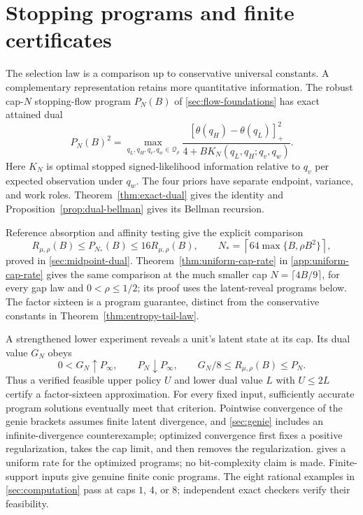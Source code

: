 \section{Stopping programs and finite certificates}\label{sec:certificates}
The selection law is a comparison up to conservative universal constants.
A complementary representation retains more quantitative information.
The robust cap-$N$ stopping-flow program $P_N(B)$ of
\cref{sec:flow-foundations} has exact attained dual
\[
 P_N(B)^2=
 \max_{q_L,q_H,q_v,q_w\in\mathcal Q_\rho}
 \frac{[\theta(q_H)-\theta(q_L)]_+^2}
 {4+B K_N(q_L,q_H;q_v,q_w)}.
\]
Here $K_N$ is optimal stopped signed-likelihood information relative to
$q_v$ per expected observation under $q_w$.
The four priors have separate endpoint, variance, and work roles.
Theorem~\ref{thm:exact-dual} gives the identity and
Proposition~\ref{prop:dual-bellman} gives its Bellman recursion.

Reference absorption and affinity testing give the explicit comparison
\begin{equation}\label{eq:certificate-program}
 R_{\mu,\rho}(B)\le P_{N_*}(B)\le16R_{\mu,\rho}(B),
 \qquad
 N_*=\left\lceil64\max\{B,\rho B^2\}\right\rceil,
\end{equation}
proved in \cref{sec:midpoint-dual}.
Theorem~\ref{thm:uniform-cap-rate} in \cref{app:uniform-cap-rate} gives the
same comparison at the much smaller cap $N=\lceil4B/9\rceil$, for every gap
law and $0<\rho\le1/2$; its proof uses the latent-reveal programs below.
The factor sixteen is a program guarantee, distinct from the conservative
constants in Theorem~\ref{thm:entropy-tail-law}.

A strengthened lower experiment reveals a unit's latent state at its cap.
Its dual value $G_N$ obeys
\[
 0<G_N\uparrow P_\infty,\qquad
 P_N\downarrow P_\infty,\qquad
 G_N/8\le R_{\mu,\rho}(B)\le P_N.
\]
Thus a verified feasible upper policy $U$ and lower dual value $L$ with
$U\le2L$ certify a factor-sixteen approximation. For every fixed input,
sufficiently accurate program solutions eventually meet that criterion.
Pointwise convergence of the genie brackets assumes finite latent
divergence, and \cref{sec:genie} includes an infinite-divergence
counterexample; optimized convergence first fixes a positive
regularization, takes the cap limit, and then removes the regularization.
 gives a uniform rate for the optimized programs; no bit-complexity claim is made.
Finite-support inputs give genuine finite conic programs.
The eight rational examples in \cref{sec:computation} pass at caps
$1$, $4$, or $8$; independent exact checkers verify their feasibility.

